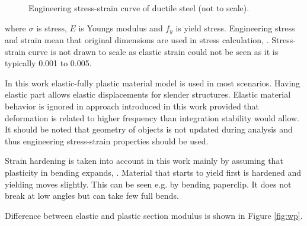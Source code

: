 \begin{figure}[htb!]
\centering
{}
\caption{Engineering stress-strain curve of ductile steel (not to scale).}
\label{fig:sscurve}
\end{figure}

where $\sigma$ is stress, $E$ is Youngs modulus and $f_y$ is yield stress.
Engineering stress and strain mean that original dimensions are used in stress calculation,
\citet{dowling}.
Stress-strain curve is not drawn to scale as elastic strain could not be seen as it is typically 0.001 to 0.005.

In this work elastic-fully plastic material model is used in most scenarios.
Having elastic part allows elastic displacements for slender structures. 
Elastic material behavior is ignored in approach introduced in this work provided
that deformation is related to higher frequency
than integration stability would allow.
It should be noted that geometry
of objects is not updated during analysis and thus engineering stress-strain properties should
be used.

Strain hardening is taken into account in this work mainly by assuming that plasticity in bending
expands, 
\citet{dowling}.
Material that starts to yield first is hardened and yielding moves slightly.
This can be seen e.g. by bending paperclip. It does not break at low angles but can take few full bends. 

Difference between elastic and plastic section modulus is shown in Figure \ref{fig:wp}.

